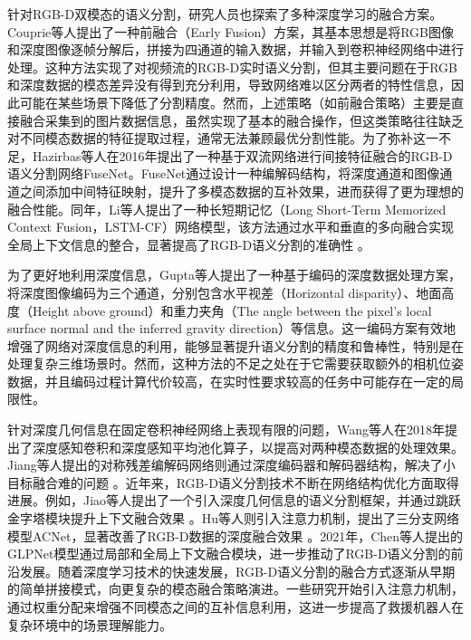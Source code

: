 针对RGB-D双模态的语义分割，研究人员也探索了多种深度学习的融合方案。Couprie等人\cite{Couprie14MLR}提出了一种前融合（Early Fusion）方案，其基本思想是将RGB图像和深度图像逐帧分解后，拼接为四通道的输入数据，并输入到卷积神经网络中进行处理。这种方法实现了对视频流的RGB-D实时语义分割，但其主要问题在于RGB和深度数据的模态差异没有得到充分利用，导致网络难以区分两者的特性信息，因此可能在某些场景下降低了分割精度。然而，上述策略（如前融合策略）主要是直接融合采集到的图片数据信息，虽然实现了基本的融合操作，但这类策略往往缺乏对不同模态数据的特征提取过程，通常无法兼顾最优分割性能。为了弥补这一不足，Hazirbas等人在2016年提出了一种基于双流网络进行间接特征融合的RGB-D语义分割网络FuseNet。FuseNet通过设计一种编解码结构，将深度通道和图像通道之间添加中间特征映射，提升了多模态数据的互补效果，进而获得了更为理想的融合性能。同年，Li等人提出了一种长短期记忆（Long Short-Term Memorized Context Fusion，LSTM-CF）网络模型，该方法通过水平和垂直的多向融合实现全局上下文信息的整合，显著提高了RGB-D语义分割的准确性 。

为了更好地利用深度信息，Gupta等人\cite{Gupta14ECCV}提出了一种基于编码的深度数据处理方案，将深度图像编码为三个通道，分别包含水平视差（Horizontal disparity）、地面高度（Height above ground）和重力夹角（The angle between the pixel’s local surface normal and the inferred gravity direction）等信息。这一编码方案有效地增强了网络对深度信息的利用，能够显著提升语义分割的精度和鲁棒性，特别是在处理复杂三维场景时。然而，这种方法的不足之处在于它需要获取额外的相机位姿数据，并且编码过程计算代价较高，在实时性要求较高的任务中可能存在一定的局限性。

针对深度几何信息在固定卷积神经网络上表现有限的问题，Wang等人在2018年提出了深度感知卷积和深度感知平均池化算子，以提高对两种模态数据的处理效果。Jiang等人提出的对称残差编解码网络则通过深度编码器和解码器结构，解决了小目标融合难的问题 。近年来，RGB-D语义分割技术不断在网络结构优化方面取得进展。例如，Jiao等人提出了一个引入深度几何信息的语义分割框架，并通过跳跃金字塔模块提升上下文融合效果 。Hu等人则引入注意力机制，提出了三分支网络模型ACNet，显著改善了RGB-D数据的深度融合效果 。2021年，Chen等人提出的GLPNet模型通过局部和全局上下文融合模块，进一步推动了RGB-D语义分割的前沿发展。随着深度学习技术的快速发展，RGB-D语义分割的融合方式逐渐从早期的简单拼接模式，向更复杂的模态融合策略演进。一些研究开始引入注意力机制，通过权重分配来增强不同模态之间的互补信息利用，这进一步提高了救援机器人在复杂环境中的场景理解能力。

















